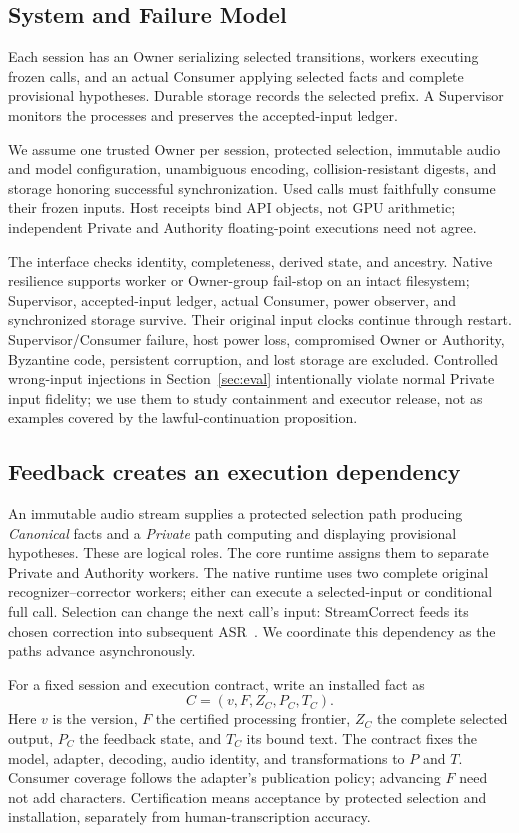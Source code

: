 \subsection{System and Failure Model}\label{subsec:failure_model}
Each session has an Owner serializing selected transitions, workers
executing frozen calls, and an actual Consumer applying selected facts
and complete provisional hypotheses. Durable storage records the
selected prefix. A Supervisor monitors the processes and preserves the
accepted-input ledger.

We assume one trusted Owner per session, protected selection, immutable
audio and model configuration, unambiguous encoding, collision-resistant
digests, and storage honoring successful synchronization. Used calls must
faithfully consume their frozen inputs. Host receipts bind API objects,
not GPU arithmetic; independent Private and Authority floating-point
executions need not agree.

The interface checks identity, completeness, derived state, and ancestry.
Native resilience supports worker or Owner-group fail-stop on an intact
filesystem; Supervisor, accepted-input ledger, actual Consumer, power
observer, and synchronized storage survive. Their original input clocks
continue through restart. Supervisor/Consumer failure, host power loss,
compromised Owner or Authority, Byzantine code, persistent corruption,
and lost storage are excluded. Controlled wrong-input injections in
Section~\ref{sec:eval} intentionally violate normal Private input fidelity;
we use them to study containment and executor release, not as examples
covered by the lawful-continuation proposition.

\subsection{Feedback creates an execution dependency}
An immutable audio stream supplies a protected selection path producing
\emph{Canonical} facts and a \emph{Private} path computing and displaying
provisional hypotheses. These are logical roles. The core runtime assigns
them to separate Private and Authority workers. The native runtime uses
two complete original recognizer--corrector workers; either can execute
a selected-input or conditional full call. Selection can change the next call's
input: StreamCorrect feeds its chosen correction into subsequent
ASR~\cite{vu2026streamcorrect}. We coordinate this dependency as the paths
advance asynchronously.

For a fixed session and execution contract, write an installed fact as
\begin{equation}
 C=(v,F,Z_C,P_C,T_C).
 \label{eq:canonical}
\end{equation}
Here $v$ is the version, $F$ the certified processing frontier, $Z_C$ the
complete selected output, $P_C$ the feedback state, and $T_C$ its bound
text. The contract fixes the model, adapter, decoding, audio identity,
and transformations to $P$ and $T$. Consumer coverage follows the adapter's
publication policy; advancing $F$ need not add characters. Certification
means acceptance by protected selection and installation, separately
from human-transcription accuracy.

